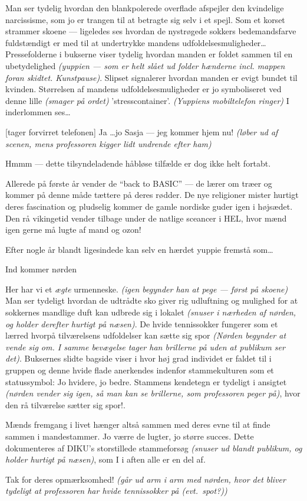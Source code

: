 \documentclass{article}
\begin{document}
\begin{sketch}
 Man ser tydelig hvordan den blankpolerede overflade
afspejler den kvindelige narcissisme, som jo er trangen til at betragte sig
selv i et spejl. Som et korset strammer skoene --- ligeledes ses hvordan de
nystrøgede sokkers bedemandsfarve fuldstændigt er med til at undertrykke
mandens udfoldelsesmuligheder\dots Pressefolderne i bukserne viser tydelig
hvordan manden er foldet sammen til en ubetydelighed {\em (yuppien --- som
  er helt slået ud folder hænderne incl. mappen foran skidtet.
  Kunstpause)}. Slipset signalerer hvordan manden er evigt bundet til
kvinden.  Størrelsen af mandens udfoldelsesmuligheder er jo symboliseret
ved denne lille {\em (smager på ordet)} 'stresscontainer'. {\em (Yuppiens
  mobiltelefon ringer)} I inderlommen ses\dots

[tager forvirret telefonen] Ja \dots jo Sasja --- jeg kommer
hjem nu! {\em (løber ud af sce\-nen, mens professoren kigger lidt undrende
  efter ham)}

 Hmmm --- dette tilsyndeladende håbløse tilfælde er dog
ikke helt fortabt.

Allerede på første år vender de ``back to BASIC'' --- de lærer om træer og
kommer på denne måde tættere på deres rødder. De nye religioner mister
hurtigt deres fascination og pludselig kommer de gamle nordiske guder igen
i højsædet. Den rå vikingetid vender tilbage under de natlige sceancer i
HEL, hvor mænd igen gerne må lugte af mand og ozon!

Efter nogle år blandt ligesindede kan selv en hærdet yuppie fremstå
som\dots 

\scene Ind kommer nørden

Her har vi et {\em ægte} urmenneske. {\em (igen begynder
  han at pege --- først på skoene)} Man ser tydeligt hvordan de udtrådte
sko giver rig udluftning og mulighed for at sokkernes mandlige duft kan
udbrede sig i lokalet {\em (snuser i nærheden af nørden, og holder derefter
  hurtigt på næsen)}. De hvide tennissokker fungerer som et lærred hvorpå
tilværelsens udfoldelser kan sætte sig spor {\em (Nørden begynder at vende
  sig om. I samme bevægelse tager han brillerne på uden at publikum ser det)}. Buksernes slidte
bagside viser i hvor høj grad individet er faldet til i gruppen og denne
hvide flade anerkendes indenfor stammekulturen som et statussymbol: Jo
hvidere, jo bedre. Stammens kendetegn er tydeligt i ansigtet {\em (nørden
  vender sig igen, så man kan se brillerne, som professoren peger på)},
hvor den rå tilværelse sætter sig spor!.

Mænds fremgang i livet hænger altså sammen med deres evne til at finde
sammen i mandestammer. Jo værre de lugter, jo større succes. Dette
dokumenteres af DIKU's storstillede stammeforsøg {\em (snuser ud blandt
  publikum, og holder hurtigt på næsen)}, som I i aften alle er en del af.

Tak for deres opmærksomhed! {\em (går ud arm i arm med nørden, hvor det
  bliver tydeligt at professoren har hvide tennissokker på (evt.\ spot?))}
  
\end{sketch}
\end{document}
